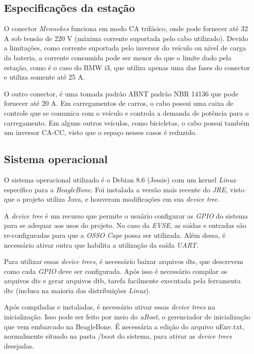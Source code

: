    \subsection{Especificações da estação}
    \label{methodology:structure:specs}

      O conector \textit{Mennekes} funciona em modo \ac{CA} trifásico, onde pode fornecer até 32 A sob tensão de 220 V (máxima corrente suportada pelo cabo utilizado). Devido a limitações, como corrente suportada pelo inversor do veículo ou nível de carga da bateria, a corrente consumida pode ser menor do que o limite dado pela estação, como é o caso do BMW i3, que utiliza apenas uma das fases do conector e utiliza somente até 25 A. 

      O outro conector, é uma tomada padrão ABNT padrão NBR 14136 \cite{nbr-14136} que pode fornecer até 20 A. Em carregamentos de carros, o cabo possui uma caixa de controle que se comunica com o veículo e controla a demanda de potência para o carregamento. Em alguns outros veículos, como bicicletas, o cabo possui também um inversor \ac{CA}-\ac{CC}, visto que o espaço nesses casos é reduzido.

    \subsection{Sistema operacional}
    \label{methodology:structure:os}

      O sistema operacional utilizado é o Debian 8.6 (Jessie) com um kernel \textit{Linux} específico para a \textit{BeagleBone}. Foi instalada a versão mais recente do \textit{\ac{JRE}}, visto que o projeto utiliza Java, e houveram modificações em sua \textit{device tree}.

      A \textit{device tree} é um recurso que permite o usuário configurar as \textit{\ac{GPIO}} do sistema para se adequar aos usos do projeto. No caso da \textit{\ac{EVSE}}, as saídas e entradas são re-configuradas para que a \textit{OSSO Cape} possa ser utilizada. Além dessa, é necessário ativar outra que habilita a utilização da saída \textit{\ac{UART}}. 

      Para utilizar essas \textit{device trees}, é necessário baixar arquivos dts, que descrevem como cada \textit{\ac{GPIO}} deve ser configurada. Após isso é necessário compilar os arquivos dts e gerar arquivos dtb, tarefa facilmente executada pela ferramenta dtc (inclusa na maioria das distribuições \textit{Linux}). 

      Após compiladas e instaladas, é necessário ativar essas \textit{device trees} na inicialização. Isso pode ser feito por meio do \textit{uBoot}, o gerenciador de inicialização que vem embarcado na BeagleBone. É necessária a edição do arquivo uEnv.txt, normalmente situado na pasta /boot do sistema, para ativar as \textit{device trees} desejadas.

